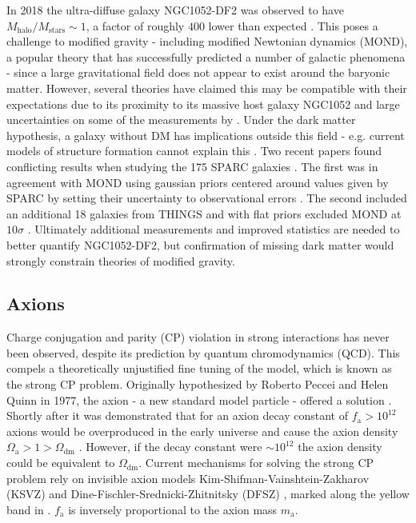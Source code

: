 In 2018 the ultra-diffuse galaxy NGC1052-DF2 was observed to have $M_{\mathrm{halo}} / M_{\mathrm{stars}} \sim 1$, a factor of
roughly $400$
lower than expected .  This poses a challenge to modified gravity - including modified Newtonian
dynamics
(MOND), a popular theory that has successfully predicted a number of galactic phenomena  - since a large
gravitational
field does not appear to exist around the baryonic matter.  However, several theories have claimed this may be compatible with their
expectations due to its proximity to its massive host galaxy NGC1052 and large uncertainties on some of the measurements by
.  Under the dark matter hypothesis, a galaxy without DM has implications outside
this field - e.g. current models of structure formation cannot explain this .  Two recent
papers found conflicting results when studying the 175 SPARC
galaxies .  The first was in agreement with MOND using gaussian priors centered around values given by SPARC by
setting
their uncertainty to observational errors .  The second included an additional 18 galaxies from THINGS
 and with flat priors excluded MOND
at $10 \sigma$ .  Ultimately additional measurements and improved statistics are needed to better
quantify NGC1052-DF2, but confirmation of missing dark matter would strongly constrain theories of modified gravity.



\subsection{Axions} \label{subsec:axions}
Charge conjugation and parity (CP) violation in strong interactions has never been observed, despite its prediction
by quantum chromodynamics (QCD).  This compels a theoretically unjustified fine tuning of the model, which
is known as the strong CP problem.  Originally hypothesized by Roberto Peccei and Helen Quinn in 1977, the
axion - a new standard model particle - offered a solution .  Shortly after it was
demonstrated that for an axion decay constant of $f_{\mathrm{a}} > 10^{12}$ axions would be overproduced in the
early universe and cause the axion density $\Omega_{\mathrm{a}} > 1 > \Omega_{\mathrm{dm}}$ .  However, if the
decay constant were ${\sim} 10^{12}$ the axion density could be equivalent to $\Omega_{\mathrm{dm}}$.  Current mechanisms for solving
the strong CP problem rely on invisible axion models Kim-Shifman-Vainshtein-Zakharov (KSVZ)  and
Dine-Fischler-Srednicki-Zhitnitsky
(DFSZ) , marked along the yellow band in .  $f_{\mathrm{a}}$ is inversely
proportional to the axion mass $m_{\mathrm{a}}$.

